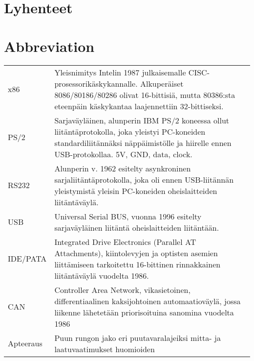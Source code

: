 \documentclass[11pt,a4paper,oneside,article]{memoir}
\begin{document}
\pagestyle{empty}
\setlength{\parskip}{1cm}
 {
  \chapter*{Lyhenteet}
} {
  \chapter*{Abbreviation}
}
\begin{table}[h]
\setlength{\tabcolsep}{8pt}
\renewcommand{\arraystretch}{2}
\begin{tabular}{l p{12cm}}
x86 & Yleisnimitys Intelin 1987 julkaisemalle CISC-prosessorikäskykannalle. Alkuperäiset 8086/80186/80286 olivat 16-bittisiä, mutta 80386:sta eteenpäin käskykantaa laajennettiin 32-bittiseksi.\\
PS/2 & Sarjaväyläinen, alunperin IBM PS/2 koneessa ollut liitäntäprotokolla, joka yleistyi PC-koneiden standardiliitännäksi näppäimistölle ja hiirelle ennen USB-protokollaa. 5V, GND, data, clock.\\
RS232 & Alunperin v. 1962 esitelty asynkroninen sarjaliitäntäprotokolla, joka oli ennen USB-liitännän yleistymistä yleisin PC-koneiden oheislaitteiden liitäntäväylä.\\
USB & Universal Serial BUS, vuonna 1996 esitelty sarjaväyläinen liitäntä oheislaitteiden liitäntään.\\
IDE/PATA & Integrated Drive Electronics (Parallel AT Attachments), kiintolevyjen ja optisten asemien liittämiseen tarkoitettu 16-bittinen rinnakkainen liitäntäväylä vuodelta 1986.\\
CAN & Controller Area Network, vikasietoinen, differentiaalinen kaksijohtoinen automaatioväylä, jossa liikenne lähetetään priorisoituina sanomina vuodelta 1986\\
Apteeraus & Puun rungon jako eri puutavaralajeiksi mitta- ja laatuvaatimukset huomioiden\\
%
\end{tabular}
\end{table}

\newpage

\pagestyle{plain}
\end{document}
